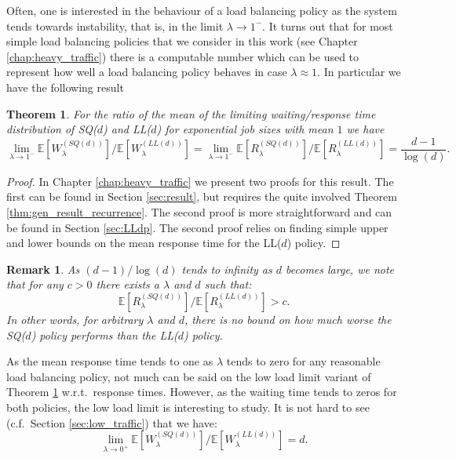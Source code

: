 \documentclass[12pt]{report}
\newcommand{\E}{\mathbb{E}}
\newtheorem{theorem}{Theorem}
\newtheorem{remark}{Remark}
\begin{document}
Often, one is interested in the behaviour of a load balancing policy as the system tends towards instability, that is, in the limit $\lambda \rightarrow 1^-$. It turns out that for most simple load balancing policies that we consider in this work (see Chapter \ref{chap:heavy_traffic}) there is a computable number which can be used to represent how well a load balancing policy behaves in case $\lambda \approx 1$. In particular we have the following result

\begin{theorem}\label{th:ratioSDdLLd}
For the ratio of the mean of the limiting waiting/response time distribution of SQ($d$) and LL($d$) for exponential job sizes with mean $1$ we have
$$
\lim_{\lambda \rightarrow 1^-} \E\left[W^{(SQ(d))}_\lambda\right] / \E\left[W^{(LL(d))}_\lambda\right]=
\lim_{\lambda \rightarrow 1^-} \E\left[R^{(SQ(d))}_\lambda\right] / \E\left[R^{(LL(d))}_\lambda\right] = \frac{d-1}{\log(d)}.
$$
\end{theorem}
\begin{proof}
In Chapter \ref{chap:heavy_traffic} we present two proofs for this result. The first can be found in Section \ref{sec:result}, but requires the quite involved Theorem \ref{thm:gen_result_recurrence}. The second proof is more straightforward and can be found in Section \ref{sec:LLdp}. The second proof relies on finding simple upper and lower bounds on the mean response time for the LL($d$) policy.
\end{proof}

\begin{remark}
As $(d-1)/\log(d)$ tends to infinity as $d$ becomes large, we note that for any $c>0$ there exists a $\lambda$ and $d$ such that:
$$
\E\left[R^{(SQ(d))}_\lambda\right] / \E\left[R^{(LL(d))}_\lambda\right] > c.
$$
In other words, 
for arbitrary $\lambda$ and $d$, there is no bound on how much worse 
the SQ($d$) policy performs than the LL($d$) policy. 
\end{remark}

As the mean response time tends to one as $\lambda$ tends to zero for any reasonable load balancing policy, not much can be said on the low load limit variant of Theorem \ref{th:ratioSDdLLd} w.r.t.~response times. However, as the waiting time tends to zeros for both policies, the low load limit is interesting to study. It is not hard to see (c.f.~Section \ref{sec:low_traffic}) that we have:
$$
\lim_{\lambda \rightarrow 0^+} \E\left[W^{(SQ(d))}_\lambda\right] / \E\left[W^{(LL(d))}_\lambda\right]= d.
$$
\end{document}
